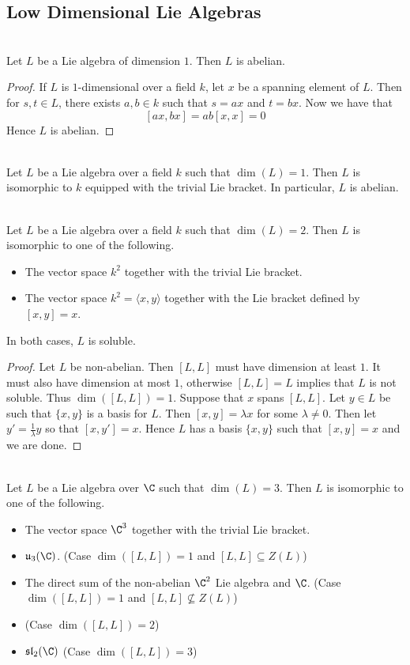 \documentclass[a4paper]{article}
\begin{document}
\subsection{Low Dimensional Lie Algebras}
\begin{lmm}{}{} \\Let $L$ be a Lie algebra of dimension $1$. Then $L$ is abelian. 
\begin{proof}
If $L$ is $1$-dimensional over a field $k$, let $x$ be a spanning element of $L$. Then for $s,t\in L$, there exists $a,b\in k$ such that $s=ax$ and $t=bx$. Now we have that $$[ax,bx]=ab[x,x]=0$$ Hence $L$ is abelian. 
\end{proof}
\end{lmm}

\begin{prp}{}{} \\Let $L$ be a Lie algebra over a field $k$ such that $\dim(L)=1$. Then $L$ is isomorphic to $k$ equipped with the trivial Lie bracket. In particular, $L$ is abelian. 
\end{prp}

\begin{prp}{}{} \\Let $L$ be a Lie algebra over a field $k$ such that $\dim(L)=2$. Then $L$ is isomorphic to one of the following. 
\begin{itemize}
\item The vector space $k^2$ together with the trivial Lie bracket. 
\item The vector space $k^2=\langle x,y\rangle$ together with the Lie bracket defined by $[x,y]=x$. 
\end{itemize} 
In both cases, $L$ is soluble. 
\begin{proof}
Let $L$ be non-abelian. Then $[L,L]$ must have dimension at least $1$. It must also have dimension at most $1$, otherwise $[L,L]=L$ implies that $L$ is not soluble. Thus $\dim([L,L])=1$. Suppose that $x$ spans $[L,L]$. Let $y\in L$ be such that $\{x,y\}$ is a basis for $L$. Then $[x,y]=\lambda x$ for some $\lambda\neq 0$. Then let $y'=\frac{1}{\lambda}y$ so that $[x,y']=x$. Hence $L$ has a basis $\{x,y\}$ such that $[x,y]=x$ and we are done. 
\end{proof}
\end{prp}

\begin{prp}{}{} \\Let $L$ be a Lie algebra over $\C$ such that $\dim(L)=3$. Then $L$ is isomorphic to one of the following. 
\begin{itemize}
\item The vector space $\C^3$ together with the trivial Lie bracket. 
\item $\mathfrak{u}_3(\C)$. (Case $\dim([L,L])=1$ and $[L,L]\subseteq Z(L)$)
\item The direct sum of the non-abelian $\C^2$ Lie algebra and $\C$. (Case $\dim([L,L])=1$ and $[L,L]\not\subseteq Z(L)$)
\item (Case $\dim([L,L])=2$)
\item $\mathfrak{sl}_2(\C)$ (Case $\dim([L,L])=3$)
\end{itemize}
\end{prp}
\end{document}

